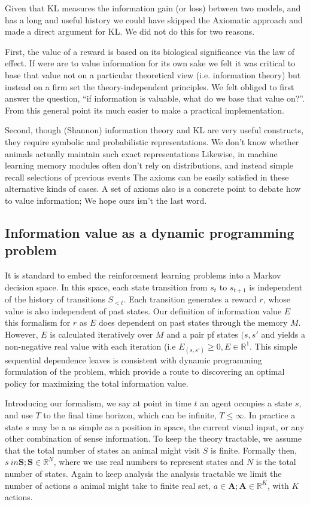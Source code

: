 \documentclass[9pt,twocolumn,twoside]{pnas-new}
\begin{document}
Given that KL measures the information gain (or loss) between two models, and has a long and useful history %
we could have skipped the Axiomatic approach and made a direct argument for KL. We did not do this for two reasons. 

First, the value of a reward is based on its biological significance via the law of effect. If were are to value information for its own sake we felt it was critical to base that value not on a particular theoretical view (i.e. information theory) but instead on a firm set the theory-independent principles. We felt obliged to first answer the question, ``if information is valuable, what do we base that value on?''. From this general point its much easier to make a practical implementation. 

Second, though (Shannon) information theory and KL are very useful constructs, they require symbolic and probabilistic representations. We don't know whether animals actually maintain such exact representations %
Likewise, in machine learning memory modules often don't rely on distributions, and instead simple recall selections of previous events %
The axioms can be easily satisfied in these alternative kinds of cases. A set of axioms also is a concrete point to debate how to value information; We hope ours isn't the last word.


\subsection*{Information value as a dynamic programming problem}
It is standard to embed the reinforcement learning problems into a Markov decision space. In this space, each state transition from $s_t$ to $s_{t+1}$ is independent of the history of transitions $S_{<t}$. Each transition generates a reward $r$, whose value is also independent of past states. Our definition of information value $E$ this formalism for $r$ as $E$ does dependent on past states through the memory $M$. However, $E$ is calculated iteratively over $M$ and a pair pf states $(s, s'$ and yields a non-negative real value with each iteration (i.e $E_{(s,s')} \ge 0, E \in \mathbb{R}^1$.  This simple sequential dependence leaves is consistent with dynamic programming formulation of the problem, which provide a route to discovering an optimal policy for maximizing the total information value. 

Introducing our formalism, we say at point in time $t$ an agent occupies a state $s$, and use $T$ to the final time horizon, which can be infinite, $T \leq \infty$. In practice a state $s$ may be a as simple as a position in space, the current visual input, or any other combination of sense information. To keep the theory tractable, we assume that the total number of states an animal might visit $S$ is finite. Formally then, $s\ in \textbf{S}; \textbf{S} \in \mathbb{R}^N$, where we use real numbers to represent states and $N$ is the total number of states. Again to keep analysis the analysis tractable we limit the number of actions $a$ animal might take to finite real set, $a \in \textbf{A}; \textbf{A} \in \mathbb{R}^K$, with $K$ actions. 
\end{document}
